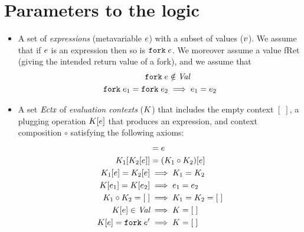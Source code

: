 
\section{Parameters to the logic}

\begin{itemize}
\item A set  of \emph{expressions} (metavariable $e$) with a
  subset  of values ($v$).  We assume that if $e$ is an
  expression then so is $\texttt{fork}\;{e}$.  We moreover assume a value
  \textsf{fRet} (giving the intended return value of a fork), and we assume that
  \begin{align*}
    \texttt{fork}\;{e} &\notin \textit{Val} \\
    \texttt{fork}\;{e_1} = \texttt{fork}\;{e_2} &\implies e_1 = e_2
  \end{align*}
\item A set $\textit{Ectx}$ of \emph{evaluation contexts} ($K$) that includes the empty context $[\; ]$,
  a plugging operation $K[e]$ that produces an expression, and context composition $\circ$
  satisfying the following axioms:
  \begin{align*}
    [\; ][ \expr ] &= \expr \\
    \ectx_1[\ectx_2[\expr]] &= (\ectx_1 \circ \ectx_2) [\expr] \\
    \ectx_1[\expr] = \ectx_2[\expr] &\implies \ectx_1 = \ectx_2 \\
    \ectx[\expr_1] = \ectx[\expr_2] &\implies \expr_1 = \expr_2 \\
    \ectx_1 \circ \ectx_2 = [\; ] &\implies \ectx_1 = \ectx_2 = [\; ] \\
    \ectx[\expr] \in \textdom{Val} &\implies \ectx = [\;] \\
    \ectx[\expr] = \fork{\expr'} &\implies \ectx = [\;]
  \end{align*}


\end{itemize}
